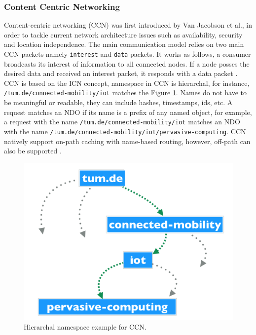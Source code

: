\subsubsection{Content Centric Networking}
Content-centric networking (CCN) was first introduced by Van Jacobson et al., in order to tackle current network architecture issues such as availability, security and location independence. The main communication model relies on two main CCN packets namely \verb|interest| and \verb|data| packets. It works as follows, a consumer broadcasts its interest of information to all connected nodes. If a node posses the desired data and received an interest packet, it responds with a data packet \cite{Jacobson:2009:NNC:1658939.1658941}.\\

\noindent CCN is  based on the ICN concept, namespace in CCN  is hierarchal, for instance, \verb|/tum.de/connected-mobility/iot| matches the Figure \ref{fig:ccn-namespace}. Names do not have to be meaningful or readable, they can include hashes, timestamps, ids, etc. A request matches an NDO if its name is a prefix of any named object, for example,  a request with the name  \verb|/tum.de/connected-mobility/iot| matches an NDO with the name  \verb|/tum.de/connected-mobility/iot/pervasive-computing|. CCN natively support on-path caching with name-based routing, however, off-path can also be supported \cite{6563278}.
\begin{figure}[H]
	\centering
	\includegraphics[scale=0.3]{images/namespace.png}
	\caption{Hierarchal namespace example for CCN.}
	\label{fig:ccn-namespace}
\end{figure}

